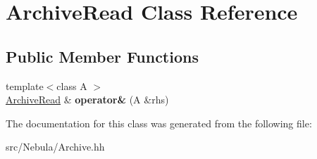 \hypertarget{classArchiveRead}{\section{Archive\-Read Class Reference}
\label{classArchiveRead}
}
\subsection*{Public Member Functions}
\begin{DoxyCompactItemize}
\item 
\hypertarget{classArchiveRead_a776e35b241a26430d288a674454f032a}{{\footnotesize template$<$class A $>$ }\\\hyperlink{classArchiveRead}{Archive\-Read} \& {\bfseries operator\&} (A \&rhs)}\label{classArchiveRead_a776e35b241a26430d288a674454f032a}

\end{DoxyCompactItemize}


The documentation for this class was generated from the following file\-:\begin{DoxyCompactItemize}
\item 
src/\-Nebula/Archive.\-hh\end{DoxyCompactItemize}
